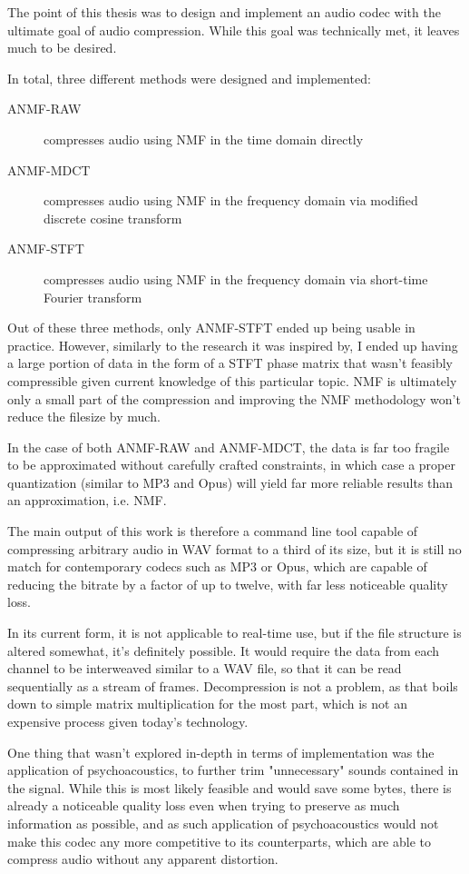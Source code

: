 The point of this thesis was to design and implement an audio codec with the ultimate goal of audio compression. While this goal was technically met, it leaves much to be desired.

In total, three different methods were designed and implemented:

\begin{description}
	\item[ANMF-RAW] compresses audio using NMF in the time domain directly
	\item[ANMF-MDCT] compresses audio using NMF in the frequency domain via modified discrete cosine transform
	\item[ANMF-STFT] compresses audio using NMF in the frequency domain via short-time Fourier transform
\end{description}

Out of these three methods, only ANMF-STFT ended up being usable in practice. However, similarly to the research it was inspired by, I ended up having a large portion of data in the form of a STFT phase matrix that wasn't feasibly compressible given current knowledge of this particular topic. NMF is ultimately only a small part of the compression and improving the NMF methodology won't reduce the filesize by much.

In the case of both ANMF-RAW and ANMF-MDCT, the data is far too fragile to be approximated without carefully crafted constraints, in which case a proper quantization (similar to MP3 and Opus) will yield far more reliable results than an approximation, i.e. NMF.

The main output of this work is therefore a command line tool capable of compressing arbitrary audio in WAV format to a third of its size, but it is still no match for contemporary codecs such as MP3 or Opus, which are capable of reducing the bitrate by a factor of up to twelve, with far less noticeable quality loss.

In its current form, it is not applicable to real-time use, but if the file structure is altered somewhat, it's definitely possible. It would require the data from each channel to be interweaved similar to a WAV file, so that it can be read sequentially as a stream of frames. Decompression is not a problem, as that boils down to simple matrix multiplication for the most part, which is not an expensive process given today's technology.

One thing that wasn't explored in-depth in terms of implementation was the application of psychoacoustics, to further trim "unnecessary" sounds contained in the signal. While this is most likely feasible and would save some bytes, there is already a noticeable quality loss even when trying to preserve as much information as possible, and as such application of psychoacoustics would not make this codec any more competitive to its counterparts, which are able to compress audio without any apparent distortion.

